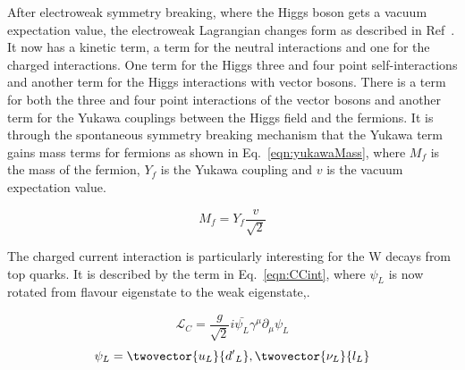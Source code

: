 

After electroweak symmetry breaking, where the Higgs boson gets a vacuum expectation value, the electroweak Lagrangian changes form as described in Ref~\cite{Pich:2005mk}. It now has a kinetic term, a term for the neutral interactions and one for the charged interactions. One term for the Higgs three and four point self-interactions and another term for the Higgs interactions with vector bosons. There is a term for both the three and four point interactions of the vector bosons and another term for the Yukawa couplings between the Higgs field and the fermions. It is through the spontaneous symmetry breaking mechanism that the Yukawa term gains mass terms for fermions as shown in Eq.~\ref{eqn:yukawaMass}, where $M_f$ is the mass of the fermion, $Y_f$ is the Yukawa coupling and $v$ is the vacuum expectation value.

\begin{equation}
M_f = Y_f \frac{v}{\sqrt{2}}
\label{eqn:yukawaMass}
\end{equation}

The charged current interaction is particularly interesting for the W decays from top quarks. It is described by the term in Eq.~\ref{eqn:CCint}, where $\psi_L$ is now rotated from flavour eigenstate to the weak eigenstate,.

\begin{equation}
\label{eqn:CCint}
\mathcal{L}_{C} = \frac{g}{\sqrt{2}} i\bar{\psi_{L}} \gamma^{\mu} \partial_{\mu} \psi_{L}
\end{equation}
\begin{equation*}
\psi_L = \twovector{u_L}{{d'}_L}, \twovector{\nu_L}{l_L}
\end{equation*}

